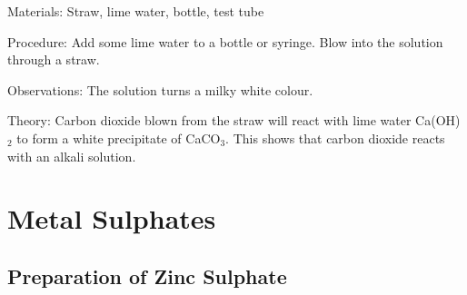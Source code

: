 \begin{multicols}{2}
\begin{description*}
\item[Materials:]{Straw, lime water, bottle, test tube}
\item[Procedure:]{Add some lime water to a bottle or syringe. Blow into the solution through a straw.}
\item[Observations:]{The solution turns a milky white colour.}
\item[Theory:]{Carbon dioxide blown from the straw will react with lime water Ca(OH)$_2$ to
form a white precipitate of CaCO$_3$. This shows that carbon dioxide reacts
with an alkali solution.}
\end{description*}

\columnbreak




\section*{Metal Sulphates}


\subsection{Preparation of Zinc Sulphate}



\end{multicols}
